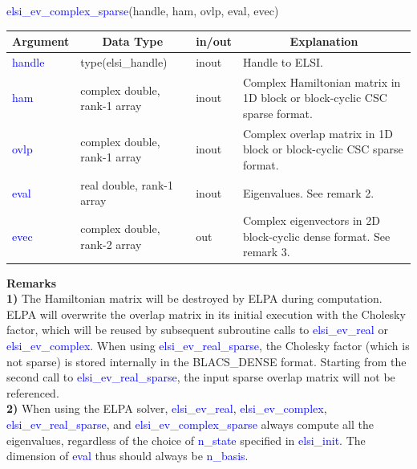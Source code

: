 \documentclass{report}
\begin{document}
\newpage
\begin{labeling}{\hspace{6cm}}
\item [\hspace{0.3cm} \textcolor{blue}{elsi\_ev\_complex\_sparse}(handle, ham, ovlp, eval, evec)]
\end{labeling}

\begin{table}[h]
\centering
\begin{tabular}[]{|p{20mm}|p{45mm}|p{15mm}|p{85mm}|}
\hline
\multicolumn{1}{|c|}{\textbf{Argument}} & \multicolumn{1}{c|}{\textbf{Data Type}} & \multicolumn{1}{c|}{\textbf{in/out}} & \multicolumn{1}{c|}{\textbf{Explanation}}\\
\hline
\textcolor{blue}{handle} & type(elsi\_handle)           & inout & Handle to ELSI.\\
\hline
\textcolor{blue}{ham}    & complex double, rank-1 array & inout & Complex Hamiltonian matrix in 1D block or block-cyclic CSC sparse format.\\
\hline
\textcolor{blue}{ovlp}   & complex double, rank-1 array & inout & Complex overlap matrix in 1D block or block-cyclic CSC sparse format.\\
\hline
\textcolor{blue}{eval}   & real double, rank-1 array    & inout & Eigenvalues.  See remark 2.\\
\hline
\textcolor{blue}{evec}   & complex double, rank-2 array & out   & Complex eigenvectors in 2D block-cyclic dense format.  See remark 3.\\
\hline
\end{tabular}
\end{table}

\bigskip
\textbf{Remarks}\\

\textbf{1)} The Hamiltonian matrix will be destroyed by ELPA during computation.  ELPA will overwrite the overlap matrix in its initial execution with the Cholesky factor, which will be reused by subsequent subroutine calls to \textcolor{blue}{elsi\_ev\_real} or \textcolor{blue}{elsi\_ev\_complex}.  When using \textcolor{blue}{elsi\_ev\_real\_sparse}, the Cholesky factor (which is not sparse) is stored internally in the BLACS\_DENSE format.  Starting from the second call to \textcolor{blue}{elsi\_ev\_real\_sparse}, the input sparse overlap matrix will not be referenced.\\

\textbf{2)} When using the ELPA solver, \textcolor{blue}{elsi\_ev\_real}, \textcolor{blue}{elsi\_ev\_complex}, \textcolor{blue}{elsi\_ev\_real\_sparse}, and \textcolor{blue}{elsi\_ev\_complex\_sparse} always compute all the eigenvalues, regardless of the choice of \textcolor{blue}{n\_state} specified in \textcolor{blue}{elsi\_init}.  The dimension of \textcolor{blue}{eval} thus should always be \textcolor{blue}{n\_basis}.\\
\end{document}
